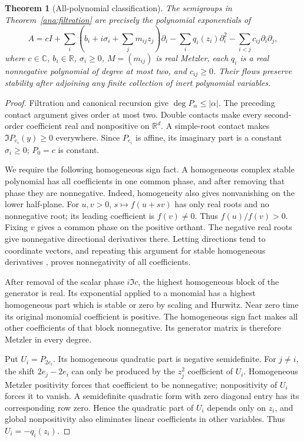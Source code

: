\documentclass[reqno]{amsart}
\newtheorem{theorem}{Theorem}[section]
\theoremstyle{definition}
\theoremstyle{remark}
\newcommand{\C}{\mathbb C}
\newcommand{\R}{\mathbb R}
\begin{document}
\begin{theorem}[All-polynomial classification]\label{ana:polynomial-classification}
The semigroups in Theorem~\ref{ana:filtration} are precisely the
polynomial exponentials of
\[
 A=cI+\sum_i\left(b_i+i\sigma_i+\sum_jm_{ij}z_j\right)\partial_i
   -\sum_i q_i(z_i)\partial_i^2
   -\sum_{i<j}c_{ij}\partial_i\partial_j,
\]
where \(c\in\C\), \(b_i\in\R\), \(\sigma_i\ge0\), \(M=(m_{ij})\)
is real Metzler, each \(q_i\) is a real nonnegative polynomial of degree
at most two, and \(c_{ij}\ge0\).  Their flows preserve stability after
adjoining any finite collection of inert polynomial variables.
\end{theorem}
\begin{proof}
Filtration and canonical recursion give \(\deg P_\alpha\le|\alpha|\).
The preceding contact argument gives order at most two.
Double contacts make every second-order coefficient real and nonpositive
on \(\R^d\).  A simple-root contact makes
\(\Im P_{e_i}(y)\ge0\) everywhere.  Since \(P_{e_i}\) is affine, its
imaginary part is a constant \(\sigma_i\ge0\); \(P_0=c\) is constant.

We require the following homogeneous sign fact.  A homogeneous complex
stable polynomial has all coefficients in one common phase, and after
removing that phase they are nonnegative.  Indeed, homogeneity also gives
nonvanishing on the lower half-plane.  For \(u,v>0\),
\(s\mapsto f(u+sv)\) has only real roots and no nonnegative root;
its leading coefficient is \(f(v)\ne0\).
Thus \(f(u)/f(v)>0\).  Fixing \(v\) gives a common phase on the positive
orthant.  The negative real roots give nonnegative directional
derivatives there.  Letting directions tend to coordinate vectors, and
repeating this argument for stable homogeneous derivatives
\cite{BB09}, proves
nonnegativity of all coefficients.

After removal of the scalar phase \(i\Im c\), the highest homogeneous
block of the generator is real.  Its exponential applied to a monomial
has a highest homogeneous part which is stable or zero by scaling and
Hurwitz.  Near zero time its original monomial coefficient is positive.
The homogeneous sign fact makes all other coefficients of that block
nonnegative.  Its generator matrix is therefore Metzler in every degree.

Put \(U_i=P_{2e_i}\).  Its homogeneous quadratic part is negative
semidefinite.  For \(j\ne i\), the shift \(2e_j-2e_i\) can only be produced
by the \(z_j^2\) coefficient of \(U_i\).  Homogeneous Metzler positivity
forces that coefficient to be nonnegative; nonpositivity of \(U_i\)
forces it to vanish.  A semidefinite quadratic form with zero diagonal
entry has its corresponding row zero.  Hence the quadratic part of
\(U_i\) depends only on \(z_i\), and global nonpositivity also eliminates
linear coefficients in other variables.  Thus \(U_i=-q_i(z_i)\).


\end{proof}
\end{document}
